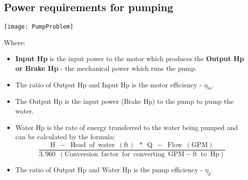\subsection{Power requirements for pumping}
\begin{center}
\texttt{[image: PumpProblem]}\\
\end{center}
Where:\\
\begin{itemize}
\item \textbf{Input Hp} is the input power to the motor which produces the \textbf{Output Hp or Brake Hp} - the mechanical power which runs the pump.  
\item The ratio of Output Hp and Input Hp is the motor efficiency - $\eta_m$.
\item The Output Hp is the input power (Brake Hp) to the pump to pump the water.
\item Water Hp is the rate of energy transferred to the water being pumped and can be calculated by the formula:\\
$$\dfrac{\mathrm{H \enspace - \enspace Head \enspace of \enspace water \enspace (ft) \enspace * \enspace Q \enspace - \enspace Flow \enspace (GPM)}}{3,960 \enspace \mathrm{(Conversion \enspace factor \enspace for \enspace converting \enspace GPM-ft \enspace to \enspace Hp)}}$$
\item The ratio of Output Hp and Water Hp is the pump efficiency - $\eta_p$.
\end{itemize}

